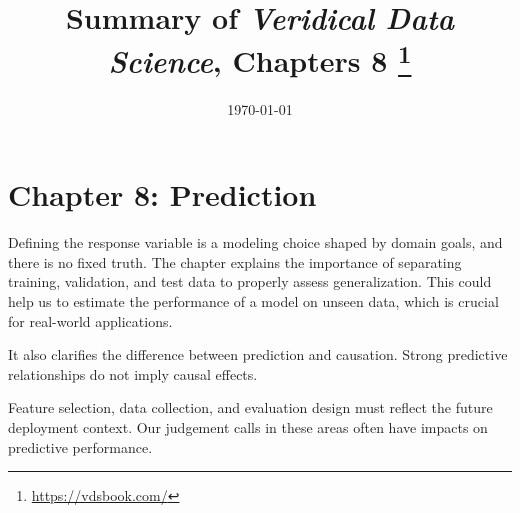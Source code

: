 \documentclass[letterpaper, 11pt]{article}
\title{\vspace{-1.5cm} Summary of \textit{Veridical Data Science}, Chapters 8 \footnote{\url{https://vdsbook.com/}}}
\date{\today}
\begin{document}
\hypersetup{colorlinks=true, linkcolor=blue, urlcolor=blue}
\maketitle

\section*{Chapter 8: Prediction}

Defining the response variable is a modeling choice shaped by domain goals, and there is no fixed truth.
The chapter explains the importance of separating training, validation, and test data to properly assess generalization.
This could help us to estimate the performance of a model on unseen data, which is crucial for real-world applications.

It also clarifies the difference between prediction and causation. 
Strong predictive relationships do not imply causal effects.

Feature selection, data collection, and evaluation design must reflect the future deployment context.
Our judgement calls in these areas often have impacts on predictive performance.

\end{document}

